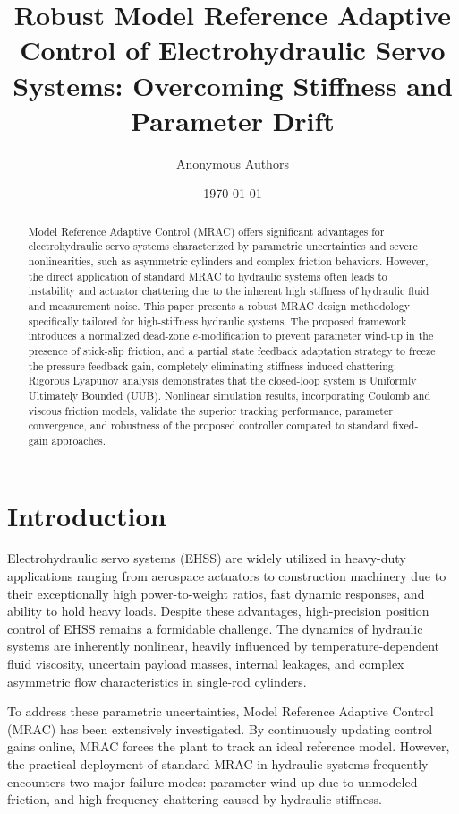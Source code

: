 \documentclass[12pt,a4paper]{article}
\title{\textbf{Robust Model Reference Adaptive Control of Electrohydraulic Servo Systems: Overcoming Stiffness and Parameter Drift}}
\author{Anonymous Authors}
\date{\today}
\begin{document}
\maketitle

\begin{abstract}
Model Reference Adaptive Control (MRAC) offers significant advantages for electrohydraulic servo systems characterized by parametric uncertainties and severe nonlinearities, such as asymmetric cylinders and complex friction behaviors. However, the direct application of standard MRAC to hydraulic systems often leads to instability and actuator chattering due to the inherent high stiffness of hydraulic fluid and measurement noise. This paper presents a robust MRAC design methodology specifically tailored for high-stiffness hydraulic systems. The proposed framework introduces a normalized dead-zone $e$-modification to prevent parameter wind-up in the presence of stick-slip friction, and a partial state feedback adaptation strategy to freeze the pressure feedback gain, completely eliminating stiffness-induced chattering. Rigorous Lyapunov analysis demonstrates that the closed-loop system is Uniformly Ultimately Bounded (UUB). Nonlinear simulation results, incorporating Coulomb and viscous friction models, validate the superior tracking performance, parameter convergence, and robustness of the proposed controller compared to standard fixed-gain approaches.
\end{abstract}

\section{Introduction}
Electrohydraulic servo systems (EHSS) are widely utilized in heavy-duty applications ranging from aerospace actuators to construction machinery due to their exceptionally high power-to-weight ratios, fast dynamic responses, and ability to hold heavy loads. Despite these advantages, high-precision position control of EHSS remains a formidable challenge. The dynamics of hydraulic systems are inherently nonlinear, heavily influenced by temperature-dependent fluid viscosity, uncertain payload masses, internal leakages, and complex asymmetric flow characteristics in single-rod cylinders.

To address these parametric uncertainties, Model Reference Adaptive Control (MRAC) has been extensively investigated. By continuously updating control gains online, MRAC forces the plant to track an ideal reference model. However, the practical deployment of standard MRAC in hydraulic systems frequently encounters two major failure modes: parameter wind-up due to unmodeled friction, and high-frequency chattering caused by hydraulic stiffness.
\end{document}
